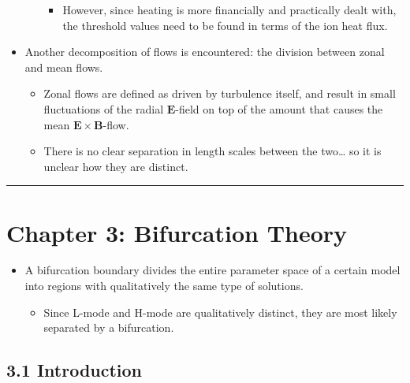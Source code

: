 \documentclass[a4paper]{article}
\begin{document}
\begin{itemize}
\begin{itemize}
    \begin{itemize}
    \itemsep1pt\parskip0pt
    \item
      However, since heating is more financially and practically dealt
      with, the threshold values need to be found in terms of the ion
      heat flux.
    \end{itemize}
  \end{itemize}
\item
  Another decomposition of flows is encountered: the division between
  zonal and mean flows.

  \begin{itemize}
  \item
    Zonal flows are defined as driven by turbulence itself, and result
    in small fluctuations of the radial $\mathbf{E}$-field on top of the
    amount that causes the mean $\mathbf{E}\times\mathbf{B}$-flow.
  \item
    There is no clear separation in length scales between the
    two\ldots{} so it is unclear how they are distinct.
  \end{itemize}
\end{itemize}

\begin{center}\rule{3in}{0.4pt}\end{center}

\section{Chapter 3: Bifurcation
Theory}\label{chapter-3-bifurcation-theory}

\begin{itemize}
\item
  A bifurcation boundary divides the entire parameter space of a certain
  model into regions with qualitatively the same type of solutions.

  \begin{itemize}
  \itemsep1pt\parskip0pt
  \item
    Since L-mode and H-mode are qualitatively distinct, they are most
    likely separated by a bifurcation.
  \end{itemize}
\end{itemize}

\subsection{3.1 Introduction}\label{introduction}
\end{document}
